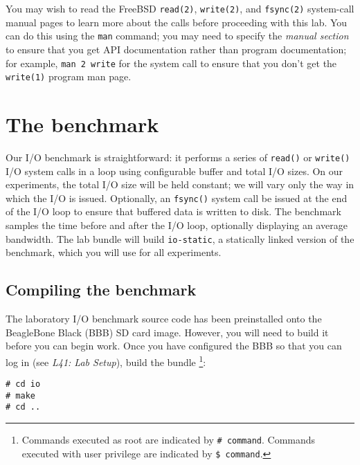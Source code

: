 \documentclass[a4paper,10pt]{article}
\newcommand{\code}[1]{\texttt{\small #1}}
\begin{document}
You may wish to read the FreeBSD \code{read(2)}, \code{write(2)}, and
\code{fsync(2)} system-call manual pages to learn more about the calls
before proceeding with this lab.
You can do this using the \code{man} command; you may need to specify the
\textit{manual section} to ensure that you get API documentation rather than
program documentation; for example, \code{man 2 write} for the system call
to ensure that you don't get the \code{write(1)} program man page.

\section*{The benchmark}

Our I/O benchmark is straightforward: it performs a series of \code{read()}
or \code{write()} I/O system calls in a loop using configurable buffer and
total I/O sizes.
On our experiments, the total I/O size will be held constant; we will vary
only the way in which the I/O is issued.
Optionally, an \code{fsync()} system call be issued at the end of the I/O
loop to ensure that buffered data is written to disk.
The benchmark samples the time before and after the I/O loop, optionally
displaying an average bandwidth.
The lab bundle will build \code{io-static}, a statically linked version of
the benchmark, which you will use for all experiments.


\subsection*{Compiling the benchmark}

The laboratory I/O benchmark source code has been preinstalled onto the
BeagleBone Black (BBB) SD card image.  However, you will need to
build it before you can begin work.  Once you have configured the BBB so that
you can log in (see \textit{L41: Lab Setup}), build the bundle
\footnote{Commands executed as root are indicated by \code{\# command}.
Commands executed with user privilege are indicated by \code{\$ command}.}:

\begin{lstlisting}[basicstyle=\small\ttfamily]
# cd io
# make
# cd ..
\end{lstlisting}
\end{document}
